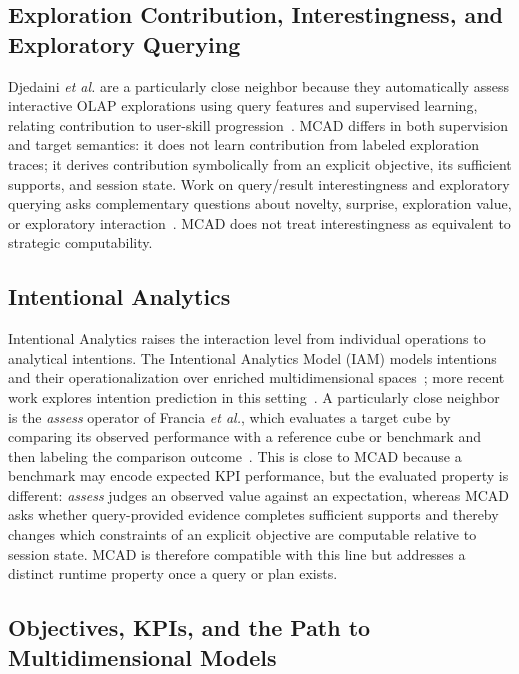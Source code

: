 \documentclass[journal]{IEEEtran}
\begin{document}
\subsection{Exploration Contribution, Interestingness, and Exploratory Querying}

Djedaini \emph{et al.} are a particularly close neighbor because they automatically assess interactive OLAP explorations using query features and supervised learning, relating contribution to user-skill progression~\cite{DjedainiEtAl2019}. MCAD differs in both supervision and target semantics: it does not learn contribution from labeled exploration traces; it derives contribution symbolically from an explicit objective, its sufficient supports, and session state. Work on query/result interestingness and exploratory querying asks complementary questions about novelty, surprise, exploration value, or exploratory interaction~\cite{GkitsakisEtAl2024,ArenasExploratory2025}. MCAD does not treat interestingness as equivalent to strategic computability.

\subsection{Intentional Analytics}

Intentional Analytics raises the interaction level from individual operations to analytical intentions. The Intentional Analytics Model (IAM) models intentions and their operationalization over enriched multidimensional spaces~\cite{VassiliadisMarcelRizzi2019}; more recent work explores intention prediction in this setting~\cite{FranciaPredict2026}. A particularly close neighbor is the \emph{assess} operator of Francia \emph{et al.}, which evaluates a target cube by comparing its observed performance with a reference cube or benchmark and then labeling the comparison outcome~\cite{FranciaAssess2021}. This is close to MCAD because a benchmark may encode expected KPI performance, but the evaluated property is different: \emph{assess} judges an observed value against an expectation, whereas MCAD asks whether query-provided evidence completes sufficient supports and thereby changes which constraints of an explicit objective are computable relative to session state. MCAD is therefore compatible with this line but addresses a distinct runtime property once a query or plan exists.

\subsection{Objectives, KPIs, and the Path to Multidimensional Models}
\end{document}
